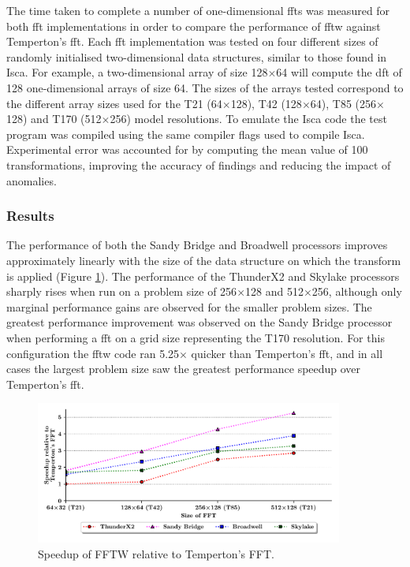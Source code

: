 \documentclass[a4paper,11pt]{report}
\begin{document}
The time taken to complete a number of one-dimensional \gls{fft}s was measured for both \gls{fft} implementations in order to compare the performance of \gls{fftw} against Temperton's \gls{fft}. Each \gls{fft} implementation was tested on four different sizes of randomly initialised two-dimensional data structures, similar to those found in Isca. For example, a two-dimensional array of size 128$\times$64 will compute the \gls{dft} of 128 one-dimensional arrays of size 64. The sizes of the arrays tested correspond to the different array sizes used for the T21 (64$\times$128), T42 (128$\times$64), T85 (256$\times$128) and T170 (512$\times$256) model resolutions. To emulate the Isca code the test program was compiled using the same compiler flags used to compile Isca. Experimental error was accounted for by computing the mean value of 100 transformations, improving the accuracy of findings and reducing the impact of anomalies.

\subsubsection{Results}
The performance of both the Sandy Bridge and Broadwell processors improves approximately linearly with the size of the data structure on which the transform is applied (Figure \ref{fig:fft-speedup}). The performance of the ThunderX2 and Skylake processors sharply rises when run on a problem size of 256$\times$128 and 512$\times$256, although only marginal performance gains are observed for the smaller problem sizes. The greatest performance improvement was observed on the Sandy Bridge processor when performing a \gls{fft} on a grid size representing the T170 resolution. For this configuration the \gls{fftw} code ran 5.25$\times$ quicker than Temperton's \gls{fft}, and in all cases the largest problem size saw the greatest performance speedup over Temperton's \gls{fft}.
\begin{figure}[htbp]
    \centering
    \includegraphics[width=0.9\textwidth]{img/speedup-fft.pdf}
    \caption[Speedup of FFTW relative to Temperton's FFT]{Speedup of FFTW relative to Temperton's FFT. }
    \label{fig:fft-speedup}
\end{figure}
\end{document}
